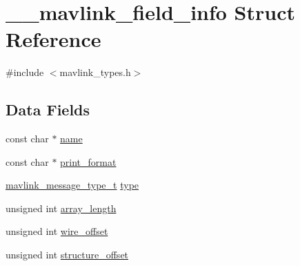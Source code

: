 \hypertarget{struct____mavlink__field__info}{\section{\+\_\+\+\_\+mavlink\+\_\+field\+\_\+info Struct Reference}
\label{struct____mavlink__field__info}
}


{\ttfamily \#include $<$mavlink\+\_\+types.\+h$>$}

\subsection*{Data Fields}
\begin{DoxyCompactItemize}
\item 
const char $\ast$ \hyperlink{struct____mavlink__field__info_a09193c7acc510180ecf6f944381e53c2}{name}
\item 
const char $\ast$ \hyperlink{struct____mavlink__field__info_af3fc635b6e03851bb683c0c3d57dfc12}{print\+\_\+format}
\item 
\hyperlink{mavlink__types_8h_ab6045b7adc25bdc05a5011a91dc645a4}{mavlink\+\_\+message\+\_\+type\+\_\+t} \hyperlink{struct____mavlink__field__info_a32f98e7c869ae1567c4ad366c74b6552}{type}
\item 
unsigned int \hyperlink{struct____mavlink__field__info_aa3ab268c4176743874c8d05694ed293f}{array\+\_\+length}
\item 
unsigned int \hyperlink{struct____mavlink__field__info_a7156648575e497f112fde78e851dd4d9}{wire\+\_\+offset}
\item 
unsigned int \hyperlink{struct____mavlink__field__info_acb947cd22e51e70e8b5f677b543196ac}{structure\+\_\+offset}
\end{DoxyCompactItemize}


